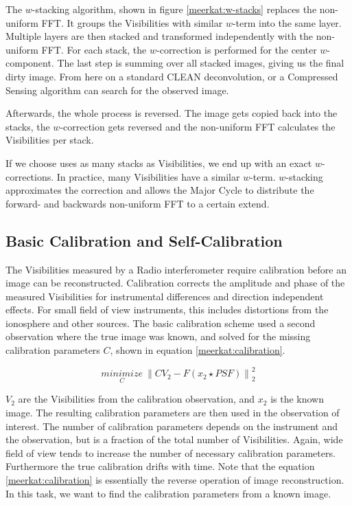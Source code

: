 The $w$-stacking algorithm, shown in figure \ref{meerkat:w-stacks} replaces the non-uniform FFT. It groups the Visibilities with similar $w$-term into the same layer. Multiple layers are then stacked and transformed independently with the non-uniform FFT. For each stack, the $w$-correction is performed for the center $w$-component. The last step is summing over all stacked images, giving us the final dirty image. From here on a standard CLEAN deconvolution, or a Compressed Sensing algorithm can search for the observed image.

Afterwards, the whole process is reversed. The image gets copied back into the stacks, the $w$-correction gets reversed and the non-uniform FFT calculates the Visibilities per stack.

If we choose uses as many stacks as Visibilities, we end up with an exact $w$-corrections. In practice, many Visibilities have a similar $w$-term. $w$-stacking approximates the correction and allows the Major Cycle to distribute the forward- and backwards non-uniform FFT to a certain extend.

\subsection{Basic Calibration and Self-Calibration}
The Visibilities measured by a Radio interferometer require calibration before an image can be reconstructed. Calibration corrects the amplitude and phase of the measured Visibilities for instrumental differences and direction independent effects. For small field of view instruments, this includes distortions from the ionosphere and other sources. The basic calibration scheme used a second observation where the true image was known, and solved for the missing calibration parameters $C$, shown in equation \eqref{meerkat:calibration}.

\begin{equation}\label{meerkat:calibration}
\underset{C}{minimize} \: \left \| CV_2 - F(x_2 \star PSF) \right \|_2^2
\end{equation}

$V_2$ are the Visibilities from the calibration observation, and $x_2$ is the known image. The resulting calibration parameters are then used in the observation of interest. The number of calibration parameters depends on the instrument and the observation, but is a fraction of the total number of Visibilities. Again, wide field of view tends to increase the number of necessary calibration parameters. Furthermore the true calibration drifts with time. Note that the equation \eqref{meerkat:calibration} is essentially the reverse operation of image reconstruction. In this task, we want to find the calibration parameters from a known image.

